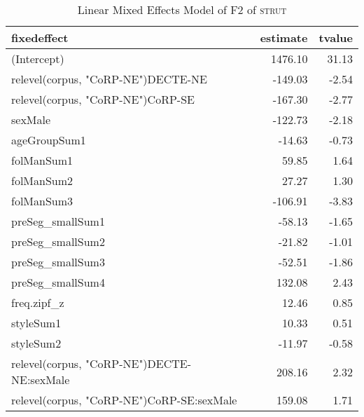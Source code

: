 \begin{table}[ht]
\centering
\begin{tabular}{lrr}
  \hline
fixedeffect & estimate & tvalue \\ 
  \hline
(Intercept) & 1476.10 & 31.13 \\ 
  relevel(corpus, "CoRP-NE")DECTE-NE & -149.03 & -2.54 \\ 
  relevel(corpus, "CoRP-NE")CoRP-SE & -167.30 & -2.77 \\ 
  sexMale & -122.73 & -2.18 \\ 
  ageGroupSum1 & -14.63 & -0.73 \\ 
  folManSum1 & 59.85 & 1.64 \\ 
  folManSum2 & 27.27 & 1.30 \\ 
  folManSum3 & -106.91 & -3.83 \\ 
  preSeg\_smallSum1 & -58.13 & -1.65 \\ 
  preSeg\_smallSum2 & -21.82 & -1.01 \\ 
  preSeg\_smallSum3 & -52.51 & -1.86 \\ 
  preSeg\_smallSum4 & 132.08 & 2.43 \\ 
  freq.zipf\_z & 12.46 & 0.85 \\ 
  styleSum1 & 10.33 & 0.51 \\ 
  styleSum2 & -11.97 & -0.58 \\ 
  relevel(corpus, "CoRP-NE")DECTE-NE:sexMale & 208.16 & 2.32 \\ 
  relevel(corpus, "CoRP-NE")CoRP-SE:sexMale & 159.08 & 1.71 \\ 
   \hline
\end{tabular}
\caption{Linear Mixed Effects Model of F2 of \textsc{strut} \label{tbl:strutF2}} 
\end{table}
